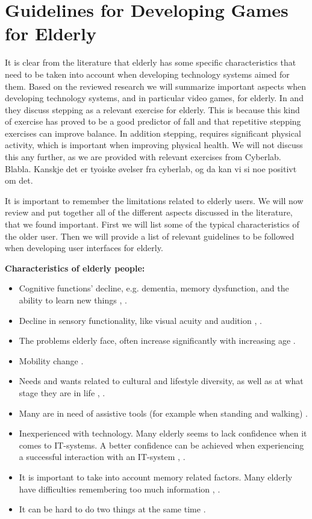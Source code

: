 \section{Guidelines for Developing Games for Elderly}
\label{sec:summaryguidelines}
It is clear from the literature that elderly has some specific characteristics that need to be taken into account when developing technology systems aimed for them. Based on the reviewed research we will summarize important aspects when developing technology systems, and in particular video games, for elderly. In \cite{bruin} and \cite{gerling2} they discuss stepping as a relevant exercise for elderly. This is because this kind of exercise has proved to be a good predictor of fall and that repetitive stepping exercises can improve balance. In addition stepping, requires significant physical activity, which is important when improving physical health. We will not discuss this any further, as we are provided with relevant exercises from Cyberlab. Blabla. Kanskje det er tyoiske øvelser fra cyberlab, og da kan vi si noe positivt om det.

It is important to remember the limitations related to elderly users. We will now review and put together all of the different aspects discussed in the literature, that we found important. First we will list some of the typical characteristics of the older user. Then we will provide a list of relevant guidelines to be followed when developing user interfaces for elderly. 

\textbf{Characteristics of elderly people:}
\begin{itemize}
\renewcommand{\labelitemi}{$\bullet$}
\item Cognitive functions' decline, e.g. dementia, memory dysfunction, and the ability to learn new things \cite{Billis}, \cite{gregor}.
\item Decline in sensory functionality, like  visual acuity and audition \cite{Billis}, \cite{gregor}.
\item The problems elderly face, often increase significantly with increasing age \cite{gregor}.
\item Mobility change \cite{Billis}.
\item Needs and wants related to cultural and lifestyle diversity, as well as at what stage they are in life \cite{Billis}, \cite{gregor}.
\item Many are in need of assistive tools (for example when standing and walking) \cite{gregor}.
\item Inexperienced with technology. Many elderly seems to lack confidence when it comes to IT-systems. A better confidence can be achieved when experiencing a successful interaction with an IT-system \cite{Billis}, \cite{gregor}.
\item It is important to take into account memory related factors. Many elderly have difficulties remembering too much information \cite{Billis}, \cite{gregor}.
\item It can be hard to do two things at the same time \cite{bruin}.
\end{itemize}


